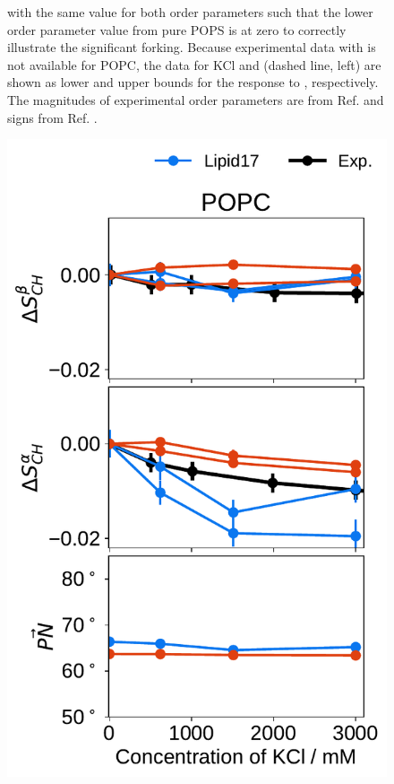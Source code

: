\documentclass[journal=jpcbfk,manuscript=article]{achemso}
\newlength{\figheight}
\begin{document}
\begin{figure}[tbp!]
{    with the same value for both order parameters such that the lower order
    parameter value from pure POPS is at zero to correctly illustrate the significant forking.
    Because experimental data with  is not available for POPC, the data for KCl and  (dashed line, left)
    are shown as lower and upper bounds for the response to , respectively.
    The magnitudes of experimental order parameters are from Ref.  and signs from Ref. .
  }
  \end{figure} 


\begin{figure}[tbp!] 
  \centering 
  \includegraphics[height=\figheight]{../img/ecc_pops/order_parameters_changes_ecc-lip_L14_A-B-PN-COO_POPC_kcl.pdf} 

\end{figure}
\end{document}
